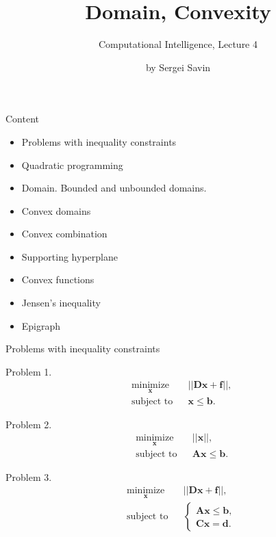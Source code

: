 \documentclass{beamer}
\title{Domain, Convexity}
\subtitle{Computational Intelligence, Lecture 4}
\author{by Sergei Savin}
\date{\mydate}
\begin{document}
\maketitle


\begin{frame}{Content}

\begin{itemize}
\item Problems with inequality constraints
\item Quadratic programming
\item Domain. Bounded and unbounded domains.
\item Convex domains
\item Convex combination
\item Supporting hyperplane
\item Convex functions
\item Jensen’s inequality
\item Epigraph
\end{itemize}

\end{frame}




\begin{frame}{Problems with inequality constraints}
\begin{flushleft}

Problem 1. 
%
\begin{equation}
\begin{aligned}
& \underset{\mathbf{x}}{\text{minimize}}
& & || \mathbf{D}\mathbf{x} + \mathbf{f} ||, \\
& \text{subject to}
& & \mathbf{x} \leq \mathbf{b}.
\end{aligned}
\end{equation}

Problem 2. 
%
\begin{equation}
\begin{aligned}
& \underset{\mathbf{x}}{\text{minimize}}
& & || \mathbf{x} ||, \\
& \text{subject to}
& & \mathbf{A}\mathbf{x} \leq \mathbf{b}.
\end{aligned}
\end{equation}

Problem 3. 
%
\begin{equation}
\begin{aligned}
& \underset{\mathbf{x}}{\text{minimize}}
& & || \mathbf{D}\mathbf{x} + \mathbf{f} ||, \\
& \text{subject to}
& & \begin{cases}
    \mathbf{A}\mathbf{x} \leq \mathbf{b}, \\
    \mathbf{C}\mathbf{x} = \mathbf{d}.
    \end{cases}
\end{aligned}
\end{equation}

\end{flushleft}
\end{frame}
\end{document}
